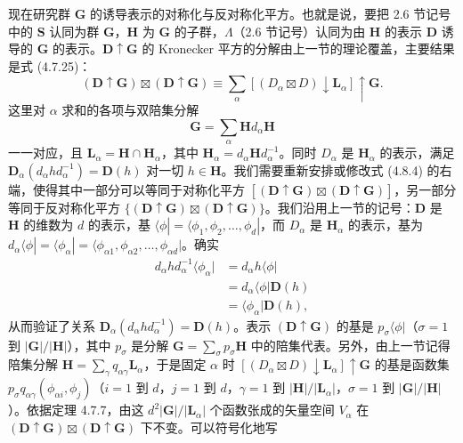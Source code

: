 现在研究群 $\mathbf{G}$ 的诱导表示的对称化与反对称化平方。也就是说，要把 2.6 节记号中的 $\mathbf{S}$ 认同为群 $\mathbf{G}$，$\mathbf{H}$ 为 $\mathbf{G}$ 的子群，$\Lambda$（2.6 节记号）认同为由 $\mathbf{H}$ 的表示 $\mathbf{D}$ 诱导的 $\mathbf{G}$ 的表示。$\mathbf{D} \uparrow \mathbf{G}$ 的 Kronecker 平方的分解由上一节的理论覆盖，主要结果是式 (4.7.25)：
\begin{equation*}
(\mathbf{D} \uparrow \mathbf{G}) \boxtimes (\mathbf{D} \uparrow \mathbf{G}) \equiv \sum_{\alpha}\left[(D_{\alpha} \boxtimes D) \downarrow \mathbf{L}_{\alpha}\right] \uparrow \mathbf{G}.
\tag{4.8.4}
\end{equation*}
这里对 $\alpha$ 求和的各项与双陪集分解
\begin{equation*}
\mathbf{G} = \sum_{\alpha}\mathbf{H}d_{\alpha}\mathbf{H}
\tag{4.8.5}
\end{equation*}
一一对应，且 $\mathbf{L}_{\alpha} = \mathbf{H} \cap \mathbf{H}_{\alpha}$，其中 $\mathbf{H}_{\alpha} = d_{\alpha}\mathbf{H}d^{-1}_{\alpha}$。同时 $D_{\alpha}$ 是 $\mathbf{H}_{\alpha}$ 的表示，满足 $\mathbf{D}_{\alpha}(d_{\alpha}hd^{-1}_{\alpha}) = \mathbf{D}(h)$ 对一切 $h \in \mathbf{H}$。我们需要重新安排或修改式 (4.8.4) 的右端，使得其中一部分可以等同于对称化平方 $\left[(\mathbf{D} \uparrow \mathbf{G}) \boxtimes (\mathbf{D} \uparrow \mathbf{G})\right]$，另一部分等同于反对称化平方 $\{(\mathbf{D} \uparrow \mathbf{G}) \boxtimes (\mathbf{D} \uparrow \mathbf{G})\}$。我们沿用上一节的记号：$\mathbf{D}$ 是 $\mathbf{H}$ 的维数为 $d$ 的表示，基 $\langle \phi | = \langle \phi_{1}, \phi_{2}, \dots, \phi_{d} |$，而 $D_{\alpha}$ 是 $\mathbf{H}_{\alpha}$ 的表示，基为 $d_{\alpha}\langle \phi | = \langle \phi_{\alpha} | = \langle \phi_{\alpha 1}, \phi_{\alpha 2}, \dots, \phi_{\alpha d} |$。确实
\begin{equation*}
\begin{array}{rl}
d_{\alpha}hd^{-1}_{\alpha}\langle \phi_{\alpha} | &= d_{\alpha}h\langle \phi |\\
&= d_{\alpha}\langle \phi |\mathbf{D}(h)\\
&= \langle \phi_{\alpha} |\mathbf{D}(h),
\end{array}
\tag{4.8.6}
\end{equation*}
从而验证了关系 $\mathbf{D}_{\alpha}(d_{\alpha}hd^{-1}_{\alpha}) = \mathbf{D}(h)$。表示 $(\mathbf{D} \uparrow \mathbf{G})$ 的基是 $p_{\sigma}\langle \phi |$（$\sigma = 1$ 到 $|\mathbf{G}|/|\mathbf{H}|$），其中 $p_{\sigma}$ 是分解 $\mathbf{G} = \sum_{\sigma}p_{\sigma}\mathbf{H}$ 中的陪集代表。另外，由上一节记得陪集分解 $\mathbf{H} = \sum_{\gamma}q_{\alpha\gamma}\mathbf{L}_{\alpha}$，于是固定 $\alpha$ 时 $\left[(D_{\alpha} \boxtimes D) \downarrow \mathbf{L}_{\alpha}\right] \uparrow \mathbf{G}$ 的基是函数集 $p_{\sigma}q_{\alpha\gamma}(\phi_{\alpha i}, \phi_{j})$（$i = 1$ 到 $d$，$j = 1$ 到 $d$，$\gamma = 1$ 到 $|\mathbf{H}|/|\mathbf{L}_{\alpha}|$，$\sigma = 1$ 到 $|\mathbf{G}|/|\mathbf{H}|$）。依据定理 4.7.7，由这 $d^{2}|\mathbf{G}|/|\mathbf{L}_{\alpha}|$ 个函数张成的矢量空间 $V_{\alpha}$ 在 $(\mathbf{D} \uparrow \mathbf{G}) \boxtimes (\mathbf{D} \uparrow \mathbf{G})$ 下不变。可以符号化地写
